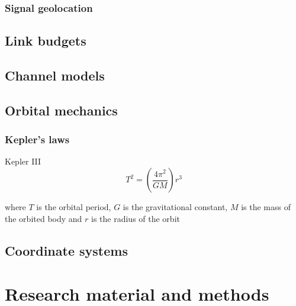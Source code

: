 \documentclass[english, 12pt, a4paper, elec, utf8, a-1b, online]{aaltothesis}
\begin{document}
\subsubsection{Signal geolocation}

\subsection{Link budgets}
\subsection{Channel models}

\subsection{Orbital mechanics}
\subsubsection{Kepler's laws}

Kepler III
\begin{equation} \label{eq-kepler-3}
  T^2 = (\frac{4\pi^2}{GM})r^3
\end{equation}

where $T$ is the orbital period, $G$ is the gravitational constant, $M$ is the mass of the orbited body and $r$ is the radius of the orbit %
\subsection{Coordinate systems}

\clearpage

\section{Research material and methods}

\end{document}
